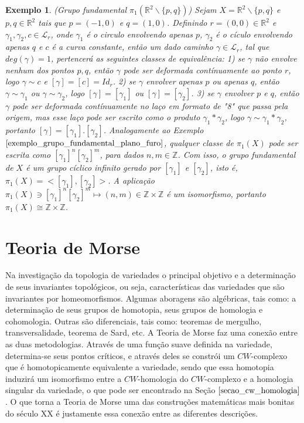 \documentclass[12pt]{book}
\newtheorem{exemplo}[teorema]{Exemplo}
\newcommand{\caminhos}{\mathcal{L}}
\newcommand{\caminhospontobase}[1]{\caminhos_{#1}}
\newcommand{\classe}[1]{[#1]}
\newcommand{\grupofundamental}[1]{\pi_{1}(#1)}
\newcommand{\inteiros}{\mathbb{Z}}
\newcommand{\real}[1]{\mathbb{R}^{#1}}
\begin{document}
	\begin{exemplo}
		(Grupo fundamental $\grupofundamental{\real{2}\backslash\{p,q\}}$) Sejam $X = \real{2}\backslash\{p,q\}$ e $p ,q \in \real{2}$ tais que $p = (-1,0)$ e $q=(1,0)$. Definindo  $r=(0,0)\in \real{2}$ e $\gamma_{1}, \gamma_{2}, c \in \caminhospontobase{r}$, onde $\gamma_{1}$ é o circulo envolvendo apenas $p$, $\gamma_{2}$ é o cículo envolvendo apenas $q$ e $c$ é a curva constante, então um dado caminho $\gamma \in \caminhospontobase{r}$, tal que $deg(\gamma) = 1$, pertencerá as seguintes classes de equivalência: 1) se $\gamma$ não envolve nenhum dos pontos $p,q$, então $\gamma$ pode ser deformada contínuamente ao ponto $r$, logo $\gamma \sim c$ e $\classe{\gamma} =\classe{c}= Id_{r}$. 2) se $\gamma$ envolver apenas $p$ ou apenas $q$, então $\gamma \sim \gamma_{1}$ ou $\gamma \sim \gamma_{2}$, logo $\classe{\gamma }=\classe{\gamma_{1}}$ ou $\classe{\gamma }=\classe{\gamma_{2}}$. 3) se $\gamma$ envolver $p$ e $q$, então $\gamma$ pode ser deformada contínuamente no laço em formato de "8" que passa pela origem, mas esse laço pode ser escrito como o produto $\gamma_{1}*\gamma_{2}$, logo $\gamma \sim \gamma_{1}*\gamma_{2}$, portanto $\classe{\gamma} = \classe{\gamma_{1}}.\classe{\gamma_{2}}$. Analogamente ao Exemplo $\ref{exemplo_grupo_fundamental_plano_furo}$, qualquer classe de $\grupofundamental{X}$ pode ser escrita como $\classe{\gamma_{1}}^{n} \classe{\gamma_{2}}^{m}$, para dados $n,m \in \inteiros$. Com isso, o grupo fundamental de $X$ é um grupo cíclico infinito gerado por $\classe{\gamma_{1}}$ e $\classe{\gamma_{2}}$, isto é, $\grupofundamental{X} = <\classe{\gamma_{1}}, \classe{\gamma_{2}}>$. A aplicação $\grupofundamental{X} \ni \classe{\gamma_{1}}^{n} \classe{\gamma_{2}}^{m} \mapsto (n,m) \in \inteiros\times\inteiros$ é um isomorfismo, portanto $\grupofundamental{X}  \cong \inteiros\times\inteiros$.
	\end{exemplo}
	
	\chapter{Teoria de Morse}
	Na investigação da topologia de variedades o principal objetivo e a determinação de seus invariantes topológicos, ou seja, características das variedades que são invariantes por homeomorfismos. Algumas aboragens são algébricas, tais como: a determinação de seus grupos de homotopia, seus grupos de homologia e cohomologia. Outras são diferenciais, tais como: teoremas de mergulho, transversalidade, teorema de Sard, etc. A Teoria de Morse faz uma conexão entre as duas metodologias. Através de uma função suave definida na variedade, determina-se seus pontos críticos, e através deles se constrói um $CW$-complexo que é homotopicamente equivalente a variedade, sendo que essa homotopia induzirá um isomorfismo entre a $CW$-homologia do $CW$-complexo e a homologia singular da variedade, o que pode ser encontrado na Seção $\ref{secao_cw_homologia}$. O que torna a Teoria de Morse uma das construções matemáticas mais bonitas do século XX é justamente essa conexão entre as diferentes descrições.
	
\end{document}
